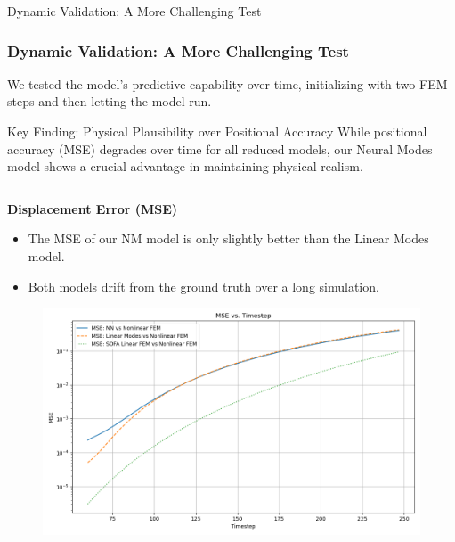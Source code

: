 \documentclass{beamer}
\begin{document}
\begin{frame}{Dynamic Validation: A More Challenging Test}
    \frametitle{Dynamic Validation: A More Challenging Test}
    
    We tested the model's predictive capability over time, initializing with two FEM steps and then letting the model run.
    
    \begin{block}{Key Finding: Physical Plausibility over Positional Accuracy}
    While positional accuracy (MSE) degrades over time for all reduced models, our Neural Modes model shows a crucial advantage in maintaining physical realism.
    \end{block}
    
    \begin{columns}[T]
        \begin{column}{0.5\textwidth}
            \textbf{Displacement Error (MSE)}
            \begin{itemize}
                \item The MSE of our NM model is only slightly better than the Linear Modes model.
                \item Both models drift from the ground truth over a long simulation.
            \end{itemize}
            \begin{figure}
                \includegraphics[width=\textwidth]{Images/beam_dynamic_mse.png}
            \end{figure}
        \end{column}
        

\end{columns}
\end{frame}
\end{document}

